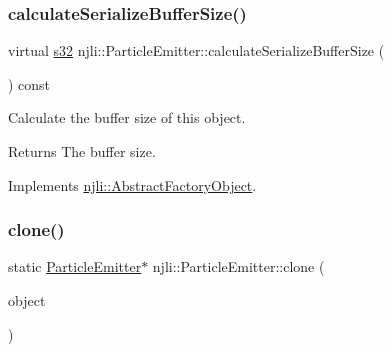 \mbox{\label{classnjli_1_1_particle_emitter_a40f59eab6df7068b7f8492b3eab2ad8e}} 
\subsubsection{\texorpdfstring{calculate\+Serialize\+Buffer\+Size()}{calculateSerializeBufferSize()}}
{\footnotesize\ttfamily virtual \mbox{\hyperlink{_util_8h_aa62c75d314a0d1f37f79c4b73b2292e2}{s32}} njli\+::\+Particle\+Emitter\+::calculate\+Serialize\+Buffer\+Size (\begin{DoxyParamCaption}{ }\end{DoxyParamCaption}) const\hspace{0.3cm}{\ttfamily [virtual]}}

Calculate the buffer size of this object.

\begin{DoxyReturn}{Returns}
The buffer size. 
\end{DoxyReturn}


Implements \mbox{\hyperlink{classnjli_1_1_abstract_factory_object_a4763d05bc9dc37c559111f8bb30e1dd8}{njli\+::\+Abstract\+Factory\+Object}}.

\mbox{\label{classnjli_1_1_particle_emitter_ae03b17179ffa67d76bbdde0fab1981ba}} 
\subsubsection{\texorpdfstring{clone()}{clone()}}
{\footnotesize\ttfamily static \mbox{\hyperlink{classnjli_1_1_particle_emitter}{Particle\+Emitter}}$\ast$ njli\+::\+Particle\+Emitter\+::clone (\begin{DoxyParamCaption}\item[{const \mbox{\hyperlink{classnjli_1_1_particle_emitter}{Particle\+Emitter}} \&}]{object }\end{DoxyParamCaption})\hspace{0.3cm}{\ttfamily [static]}}

